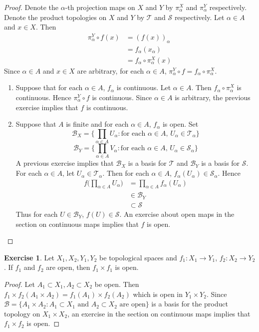 \documentclass[12pt]{amsart}
\theoremstyle{definition}
\newtheorem{ex}[definition]{Exercise}
\newcommand{\al}{\alpha}
\newcommand{\MB}{\mathcal{B}}
\newcommand{\MS}{\mathcal{S}}
\newcommand{\MT}{\mathcal{T}}
\DeclareMathOperator*{\0}{\mbf{0}}
\DeclareMathOperator*{\1}{\mbf{1}}
\begin{document}
	\begin{proof} Denote the $\al$-th projection maps on $X$ and $Y$ by $\pi^X_{\al}$ and $\pi^Y_{\al}$ respectively. Denote the product topologies on $X$ and $Y$ by $\MT$ and $\MS$ respectively. Let $\al \in A$ and $x \in X$. Then
		\begin{align*}
			\pi^Y_{\al} \circ f(x) 
			& = (f(x))_{\al} \\
			& = f_{\al}(x_{\al}) \\
			& = f_{\al} \circ \pi^X_{\al}(x) 
		\end{align*}
		Since $\al \in A$ and $x \in X$ are arbitrary, for each $\al \in A$, $\pi^Y_{\al} \circ f = f_{\al} \circ \pi^X_{\al}$.
		\begin{enumerate}
			\item Suppose that for each $\al \in A$, $f_{\al}$ is continuous. Let $\al \in A$. Then $f_{\al} \circ \pi^X_{\al}$ is continuous. Hence $\pi^Y_{\al} \circ f$ is continuous. Since $\al \in A$ is arbitrary, the previous exercise implies that $f$ is continuous.
			\item Suppose that $A$ is finite and for each $\al \in A$, $f_{\al}$ is open. Set 
			$$\MB_X = \bigg\{ \prod\limits_{\al \in A} U_{\al} : \text{for each $\al \in A$, } U_{\al} \in \MT_{\al}\bigg\}$$ 
			$$\MB_Y = \bigg\{ \prod\limits_{\al \in A} V_{\al} : \text{for each $\al \in A$, } U_{\al} \in \MS_{\al}\bigg\}$$ 
			A previous exercise implies that $\MB_X$ is a basis for $\MT$ and $\MB_Y$ is a basis for $\MS$. For each $\al \in A$, let $U_{\al} \in \MT_{\al}$. Then for each $\al \in A$, $f_{\al}(U_{\al}) \in \MS_{\al}$. Hence
			\begin{align*}
				f\bigg( \prod\limits_{\al \in A} U_{\al}\bigg) 
				& = \prod_{\al \in A} f_{\al}(U_{\al}) \\
				& \in \MB_{Y} \\
				& \subset \MS
			\end{align*}
			Thus for each $U \in \MB_Y$, $f(U) \in \MS$. An exercise about open maps in the section on continuous maps implies that $f$ is open.
		\end{enumerate}
	\end{proof}

	\begin{ex}
		Let $X_1, X_2,Y_1,Y_2$ be topological spaces and $f_1:X_1 \rightarrow Y_1$, $f_2:X_2 \rightarrow Y_2$. If $f_1$ and $f_2$ are open, then $f_1 \times f_1$ is open.
	\end{ex}
	
	\begin{proof}
		Let $A_1 \subset X_1, A_2 \subset X_2$ be open. Then $f_1 \times f_2(A_1 \times A_2) = f_1(A_1) \times f_2(A_2)$ which is open in $Y_1 \times Y_2$. Since $\MB = \{A_1 \times A_2:  \text{$A_1 \subset X_1$ and $A_2 \subset X_2$ are open} \}$ is a basis for the product topology on $X_1 \times X_2$, an exercise in the section on continuous maps implies that $f_1 \times f_2$ is open.
	\end{proof}
	
\end{document}
